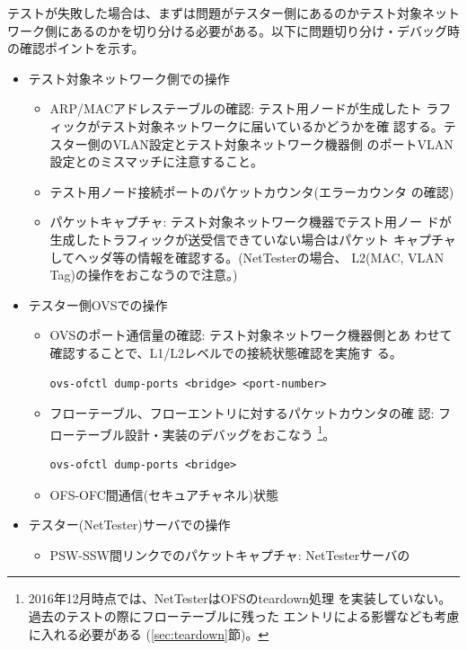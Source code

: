 テストが失敗した場合は、まずは問題がテスター側にあるのかテスト対象ネット
ワーク側にあるのかを切り分ける必要がある。以下に問題切り分け・デバッグ時
の確認ポイントを示す。
\begin{itemize}
 \item テスト対象ネットワーク側での操作
       \begin{itemize}
        \item ARP/MACアドレステーブルの確認: テスト用ノードが生成したト
              ラフィックがテスト対象ネットワークに届いているかどうかを確
              認する。テスター側のVLAN設定とテスト対象ネットワーク機器側
              のポートVLAN設定とのミスマッチに注意すること。
        \item テスト用ノード接続ポートのパケットカウンタ(エラーカウンタ
              の確認)
        \item パケットキャプチャ: テスト対象ネットワーク機器でテスト用ノー
              ドが生成したトラフィックが送受信できていない場合はパケット
              キャプチャしてヘッダ等の情報を確認する。(NetTesterの場合、
              L2(MAC, VLAN Tag)の操作をおこなうので注意。)
       \end{itemize}
 \item テスター側OVSでの操作
       \begin{itemize}
        \item OVSのポート通信量の確認: テスト対象ネットワーク機器側とあ
              わせて確認することで、L1/L2レベルでの接続状態確認を実施す
              る。
\begin{lstlisting}
ovs-ofctl dump-ports <bridge> <port-number>
\end{lstlisting}
        \item フローテーブル、フローエントリに対するパケットカウンタの確
              認: フローテーブル設計・実装のデバッグをおこなう
              \footnote{2016年12月時点では、NetTesterはOFSのteardown処理
              を実装していない。過去のテストの際にフローテーブルに残った
              エントリによる影響なども考慮に入れる必要がある
              (\ref{sec:teardown}節)。}。
\begin{lstlisting}
ovs-ofctl dump-ports <bridge>
\end{lstlisting}
        \item OFS-OFC間通信(セキュアチャネル)状態
       \end{itemize}
 \item テスター(NetTester)サーバでの操作
       \begin{itemize}
        \item PSW-SSW間リンクでのパケットキャプチャ: NetTesterサーバの

\end{itemize}
\end{itemize}
